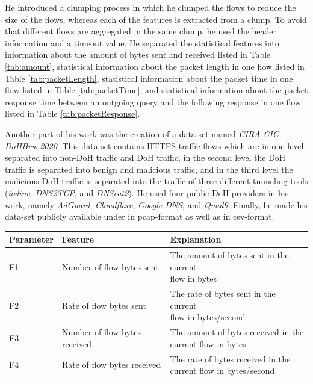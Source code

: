 He introduced a clumping process in which he clumped the flows to reduce the size of the flows, whereas each of the features is extracted from a clump. To avoid that different flows are aggregated in the same clump, he used the header information and a timeout value. He separated the statistical features into information about the amount of bytes sent and received listed in Table \ref{tab:amount}, statistical information about the packet length in one flow listed in Table \ref{tab:packetLength}, statistical information about the packet time in one flow listed in Table \ref{tab:packetTime}, and statistical information about the packet response time between an outgoing query and the following response in one flow listed in Table \ref{tab:packetResponse}.

Another part of his work was the creation of a data-set named \textit{CIRA-CIC-DoHBrw-2020}. This data-set contains HTTPS traffic flows which are in one level separated into non-DoH traffic and DoH traffic, in the second level the DoH traffic is separated into benign and malicious traffic, and in the third level the malicious DoH traffic is separated into the traffic of three different tunneling tools (\textit{iodine}. \textit{DNS2TCP}, and \textit{DNScat2}). He used four public DoH providers in his work, namely \textit{AdGuard}, \textit{Cloudflare}, \textit{Google DNS}, and \textit{Quad9}. Finally, he made his data-set publicly available under \cite{CIRA-CIC-DoHBrw-2020} in pcap-format as well as in csv-format.

\begin{center}
\begin{longtable}{ |l|l|l| }
\hline
Parameter & Feature & Explanation \\
\hline
F1 & Number of flow bytes sent & \makecell{The amount of bytes sent in the current \\ flow in bytes} \\
\hline
F2 & Rate of flow bytes sent & \makecell{The rate of bytes sent in the current \\ flow in bytes/second} \\
\hline
F3 & Number of flow bytes received & \makecell{The amount of bytes received in the \\ current flow in bytes} \\
\hline
F4 & Rate of flow bytes received & \makecell{The rate of bytes received in the \\ current flow in bytes/second} \\
\hline
\end{longtable}
 \label{tab:amount} 
\end{center}

